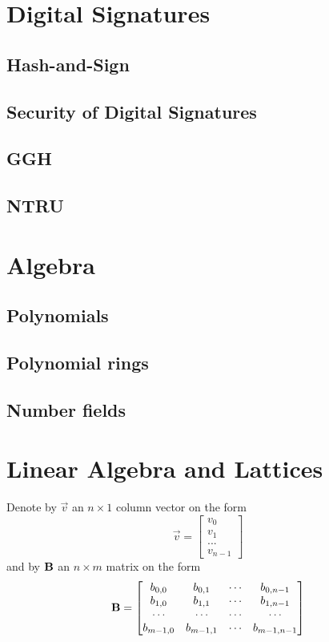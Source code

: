 \section{Digital Signatures}
\subsection{Hash-and-Sign}
\subsection{Security of Digital Signatures}
\subsection{GGH}
\subsection{NTRU}

\section{Algebra}
\subsection{Polynomials}
\subsection{Polynomial rings}
\subsection{Number fields}

\section{Linear Algebra and Lattices}
Denote by $\vec{v}$ an $n \times 1$ column vector on the form 
\[ \vec{v} = \begin{bmatrix} v_0 \\ v_1 \\ ... \\ v_{n-1} \end{bmatrix}\] and by $\mathbf{B}$ an $n \times m$ matrix on the form 
\[
    \mathbf{B} = 
    \begin{bmatrix}
        b_{0,0} & b_{0,1} & \cdots & b_{0, n-1} \\ 
        b_{1,0} & b_{1,1} & \cdots & b_{1, n-1} \\ 
        \cdots & \cdots & \cdots & \cdots\\
        b_{m-1,0} & b_{m-1,1} & \cdots & b_{m-1, n-1} \\ 
    \end{bmatrix}
\]

